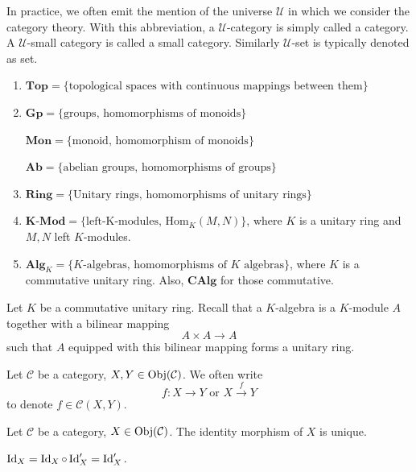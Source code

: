 \begin{remark}
    In practice, we often emit the mention of the universe $\mathcal{U}$ in which we consider the category theory. With this abbreviation, a $\mathcal{U}$-category is simply called a category. A $\mathcal{U}$-small category is called a small category. Similarly $\mathcal{U}$-set is typically denoted as set.
\end{remark}
\begin{notationenv}
    \quad
\begin{enumerate}[label=(\arabic*)]
    \item $\mathbf{Top} = \{\text{topological spaces with continuous mappings between them}\}$
    \item $\mathbf{Gp} = \{\text{groups, homomorphisms of monoids}\}$
    
        $\mathbf{Mon} = \{\text{monoid, homomorphism of monoids}\}$

        $\mathbf{Ab}= \{\text{abelian groups, homomorphisms of groups}\}$
    \item $\mathbf{Ring} = \{\text{Unitary rings, homomorphisms of unitary rings}\}$
    \item $\mathbf{K}\text{-}\mathbf{Mod} = \{\text{left-K-modules, }\mathrm{Hom}_K(M,N)\}$, where $K$ is a unitary ring and $M,N$ left $K$-modules.
    \item $\mathbf{Alg}_K=\{K\text{-algebras, homomorphisms of }K\text{ algebras}\}$, where $K$ is a commutative unitary ring.
        Also, $\mathbf{CAlg}$ for those commutative.
\end{enumerate}
\end{notationenv}
\begin{remark}
    Let $K$ be a commutative unitary ring. Recall that a $K$-algebra is a $K$-module $A$ together with a bilinear mapping $$A\times A\rightarrow A$$ such that $A$ equipped with this bilinear mapping forms a unitary ring.
\end{remark}
\begin{notationenv}
    Let $\mathcal{C}$ be a category, $X,Y\in \operatorname{\mathrm{Obj}}(\mathcal{C})$. We often write 
    $$ f: X\rightarrow Y \text{ or } X\overset{f}{\longrightarrow} Y$$
    to denote $f\in \mathcal{C}(X,Y)$.
\end{notationenv}
\begin{propositionenv}
    Let $\mathcal{C}$ be a category, $X\in \operatorname{\mathrm{Obj}}(\mathcal{C})$. The identity morphism of $X$ is unique.
\end{propositionenv}
\begin{proofenv}
    $ \operatorname{\mathrm{Id}}_X = \operatorname{\mathrm{Id}}_X \circ \operatorname{\mathrm{Id}}_X' = \operatorname{\mathrm{Id}}_X'.$
\end{proofenv}
